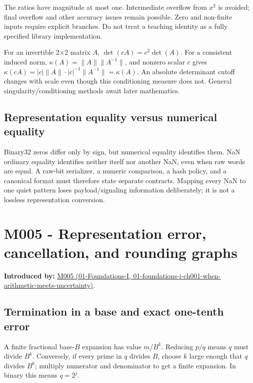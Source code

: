The ratios have magnitude at most one. Intermediate overflow from \(x^2\) is avoided; final overflow and other accuracy issues remain possible. Zero and non-finite inputs require explicit branches. Do not treat a teaching identity as a fully specified library implementation.

For an invertible 2×2 matrix \(A\), \(\det(cA)=c^2\det(A)\). For a consistent induced norm, \(\kappa(A)=\|A\|\|A^{-1}\|\), and nonzero scalar \(c\) gives \(\kappa(cA)=|c|\|A\|\cdot|c|^{-1}\|A^{-1}\|=\kappa(A)\). An absolute determinant cutoff changes with scale even though this conditioning measure does not. General singularity/conditioning methods await later mathematics.

\subsection{Representation equality versus numerical equality}\label{03-visual-computing-i-ch018-representation-equality-versus-numerical-equality}

Binary32 zeros differ only by sign, but numerical equality identifies them. NaN ordinary equality identifies neither itself nor another NaN, even when raw words are equal. A raw-bit serializer, a numeric comparison, a hash policy, and a canonical format must therefore state separate contracts. Mapping every NaN to one quiet pattern loses payload/signaling information deliberately; it is not a lossless representation conversion.

\section{M005 - Representation error, cancellation, and rounding graphs}\label{03-visual-computing-i-ch018-m005---representation-error-cancellation-and-rounding-graphs}

\textbf{Introduced by:} \href{../01-Foundations-I/main.pdf\#nameddest=01-foundations-i-ch001-when-arithmetic-meets-uncertainty}{M005 (01-Foundations-I, 01-foundations-i-ch001-when-arithmetic-meets-uncertainty)}.

\subsection{Termination in a base and exact one-tenth error}\label{03-visual-computing-i-ch018-termination-in-a-base-and-exact-one-tenth-error}

A finite fractional base-\(B\) expansion has value \(m/B^k\). Reducing \(p/q\) means \(q\) must divide \(B^k\). Conversely, if every prime in \(q\) divides \(B\), choose \(k\) large enough that \(q\) divides \(B^k\); multiply numerator and denominator to get a finite expansion. In binary this means \(q=2^j\).

